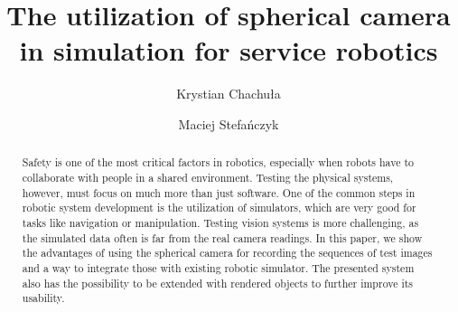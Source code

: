 \documentclass{svproc}
\begin{document}
\mainmatter

\title{The utilization of spherical camera in simulation for service robotics}

\author{Krystian Chachuła \and Maciej Stefańczyk}


\maketitle

\begin{abstract}

    Safety is one of the most critical factors in robotics, especially when robots have to 
    collaborate with people in a shared environment. Testing the physical systems, however, must
    focus on much more than just software. One of the common steps in robotic system development
    is the utilization of simulators, which are very good for tasks like navigation or manipulation.
    Testing vision systems is more challenging, as the simulated data often is far from the
    real camera readings. In this paper, we show the advantages of using the spherical camera
    for recording the sequences of test images and a way to integrate those with existing
    robotic simulator. The presented system also has the possibility to be extended with rendered
    objects to further improve its usability.


\end{abstract}
\end{document}
